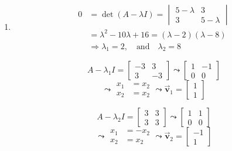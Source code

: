 \documentclass[letter,11pt]{article}
\theoremstyle{definition}
\begin{document}
\begin{tcolorbox}[boxrule=1mm,enhanced jigsaw, breakable,before=\hfill,after=\hfill,adjusted title={Problem 5 solutions}]
    \begin{enumerate}[label = (\Alph*.)]
        \item 
            \begin{align*}
                0 &=\operatorname{det}(A-\lambda I) = \begin{vmatrix}5-\lambda & 3 \\ 3 & 5-\lambda \end{vmatrix}\\
                &= \lambda^2 -10\lambda +16 = \left(\lambda - 2\right)\left(\lambda - 8\right)\\
                &\Rightarrow \boxed{\lambda_{1} = 2, \quad \text{and}\quad \lambda_{2}=8}
            \end{align*}
            \begin{minipage}{0.5\textwidth}
            $$A-\lambda_{1}I = \begin{bmatrix} -3 & 3\\ 3 & -3 \end{bmatrix}\leadsto \begin{bmatrix} 1 & -1 \\ 0 & 0\end{bmatrix}$$
            $$\leadsto\begin{aligned}
                 x_{1} &= x_{2}\\
                x_{2} &= x_{2}
            \end{aligned} \leadsto \vec{\boldsymbol{v}}_1 = \begin{bmatrix}1\\1\end{bmatrix}$$
            \end{minipage}
            \begin{minipage}{0.5\textwidth}
            $$A-\lambda_{2}I = \begin{bmatrix} 3 & 3\\ 3 & 3 \end{bmatrix}\leadsto \begin{bmatrix} 1 & 1 \\ 0 & 0\end{bmatrix}$$
            $$\leadsto\begin{aligned}
                 x_{1} &= -x_{2}\\
                x_{2} &= x_{2}
            \end{aligned} \leadsto \vec{\boldsymbol{v}}_2 = \begin{bmatrix}-1\\1\end{bmatrix}$$

\end{minipage}
\end{enumerate}
\end{tcolorbox}
\end{document}
